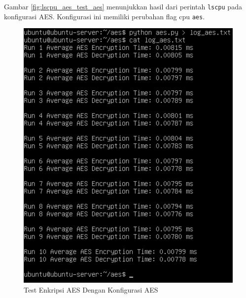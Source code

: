 Gambar \ref{fig:lscpu_aes_test_aes} menunjukkan hasil dari perintah \texttt{lscpu} pada konfigurasi AES. Konfigurasi ini memiliki perubahan flag cpu \texttt{aes}.

\begin{figure}
    \centering
    \includegraphics[width=1\textwidth]
    {assets/pics/aes-test/aes.jpeg}
    \caption{Test Enkripsi AES Dengan Konfigurasi AES}
    \label{fig:aes_test_aes}
\end{figure}

